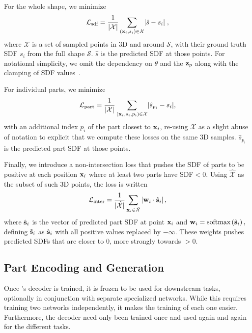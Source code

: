 For the whole shape, we minimize
\begin{equation}
	\mathcal{L}_\text{sdf} = \frac{1}{\lvert \mathcal{X} \rvert} \sum_{(\mathbf{x}_i, s_i) \in \mathcal{X}} \lvert \hat{s} - s_i \rvert \; ,
\end{equation}
%
where $\mathcal{X}$ is a set of sampled points in 3D and around $\mathcal{S}$, with their ground truth SDF $s_i$ from the full shape $\mathcal{S}$. $\hat{s}$ is the predicted SDF at those points. For notational simplicity,  we omit the dependency on $\theta$ and the $\mathbf{z}_p$ along with the clamping of SDF values~\cite{Park19c}. 

For individual parts, we minimize 
%
\begin{equation}
	\mathcal{L}_\text{part}= \frac{1}{\lvert \mathcal{X} \rvert} \sum_{(\mathbf{x}_i, s_i, p_i) \in \mathcal{X}} \lvert \hat{s}_{p_i} - s_i \rvert,
\end{equation}
%
with an additional index $p_i$ of the part closest to $\mathbf{x}_i$, re-using $\mathcal{X}$ as a slight abuse of notation to explicit that we compute these losses on the same 3D samples. $\hat{s}_{p_i}$ is the predicted part SDF at those points. 

Finally, we introduce a non-intersection loss that pushes the SDF of parts to be positive at each position $\mathbf{x}_i$ where at least two parts have SDF$<0$. Using $\hat{\mathcal{X}}$ as the subset of such 3D points, the loss is written
%
\begin{equation}
	\label{eq:noninter}
	\mathcal{L}_\text{inter}= \frac{1}{\lvert \hat{\mathcal{X}} \rvert} \sum_{\mathbf{x}_i \in \hat{\mathcal{X}}} \left\lvert \mathbf{w}_i \cdot \hat{\mathbf{s}}_i \right\rvert,
\end{equation}
%
where $\hat{\mathbf{s}}_i$ is the vector of predicted part SDF at point $\mathbf{x}_i$ and
$\mathbf{w}_i = \text{softmax}\left(\tilde{\mathbf{s}}_i\right),$
defining $\tilde{\mathbf{s}}_i$ as $\hat{\mathbf{s}}_i$ with all positive values replaced by $-\infty$. These weights pushes predicted SDFs that are closer to 0, more strongly towards $>0$.


\subsection{Part Encoding and Generation}
\label{sec:method-enc}

Once \PSDF{}'s decoder is trained, it is frozen to be used for downstream tasks, optionally in conjunction with separate specialized networks. While this requires training two networks independently, it makes the training of each one easier. Furthermore, the decoder need only been trained once and used again and again for the different tasks. 

